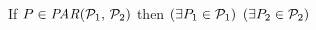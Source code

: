   

  \noindent
  If $\aPS \in \sLPAR{\aPSS_1}{\aPSS_2}$ then  
  $(\exists P_1\in\mathcal{P}_1)$ $(\exists P_2\in\mathcal{P}_2)$
